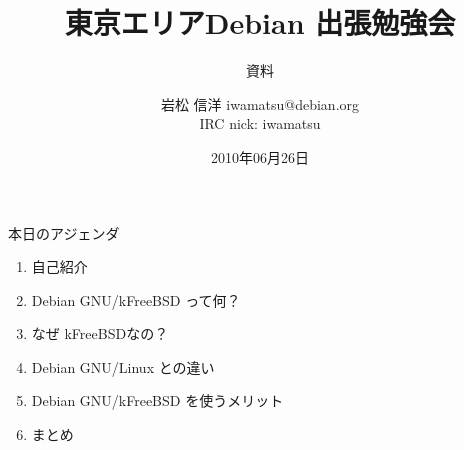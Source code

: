 \title{東京エリアDebian 出張勉強会}
\subtitle{資料}
\author{岩松 信洋 iwamatsu@debian.org\\IRC nick: iwamatsu}
\date{2010年06月26日}



\frame{\titlepage{}}





\begin{frame}{本日のアジェンダ}
 \begin{enumerate}
  \item 自己紹介
  \item Debian GNU/kFreeBSD って何？
  \item なぜ kFreeBSDなの？
  \item Debian GNU/Linux との違い
  \item Debian GNU/kFreeBSD を使うメリット
  \item まとめ
 \end{enumerate}
\end{frame}

